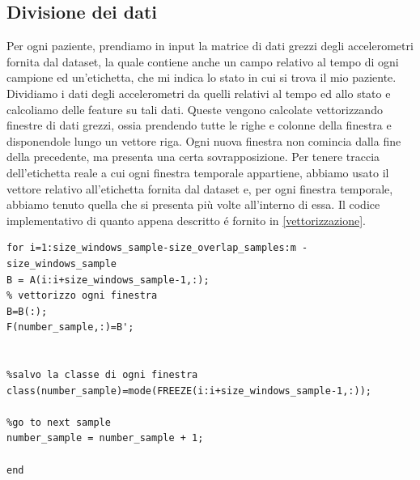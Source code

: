 \subsection{Divisione dei dati}
Per ogni paziente, prendiamo in input la matrice di dati grezzi degli accelerometri fornita dal dataset, la quale contiene anche un campo relativo al tempo di ogni campione ed un'etichetta, che mi indica lo stato in cui si trova il mio paziente. Dividiamo i dati degli accelerometri da quelli relativi al tempo ed allo stato e calcoliamo delle feature su tali dati. Queste vengono calcolate vettorizzando finestre di dati grezzi, ossia prendendo tutte le righe e colonne della finestra e disponendole lungo un vettore riga.  Ogni nuova finestra non comincia dalla fine della precedente, ma presenta una certa sovrapposizione. Per tenere traccia dell'etichetta reale a cui ogni finestra temporale appartiene, abbiamo usato il vettore relativo all'etichetta fornita dal dataset e, per ogni finestra temporale, abbiamo tenuto quella che si presenta più volte all'interno di essa. Il codice implementativo di quanto appena descritto é fornito in \ref{vettorizzazione}.
\begin{lstlisting}[style=Matlab-editor,frame=single, caption=Vettorizzazione dei dati degli accelerometri, label=vettorizzazione]
for i=1:size_windows_sample-size_overlap_samples:m - size_windows_sample
B = A(i:i+size_windows_sample-1,:);
% vettorizzo ogni finestra
B=B(:);
F(number_sample,:)=B';


%salvo la classe di ogni finestra
class(number_sample)=mode(FREEZE(i:i+size_windows_sample-1,:));

%go to next sample
number_sample = number_sample + 1;

end
\end{lstlisting}
